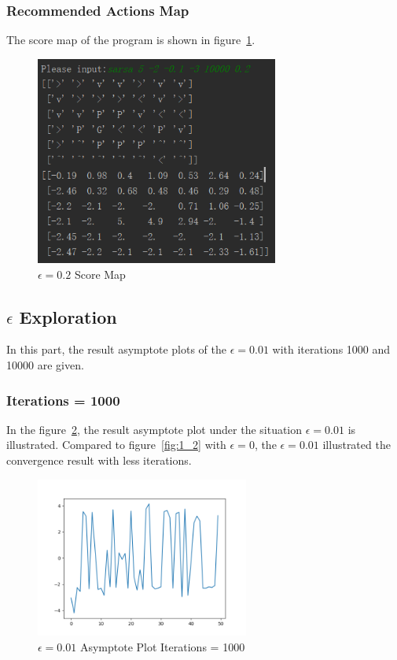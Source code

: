 \documentclass[11pt, a4paper]{article}
\begin{document}
\newpage

\subsubsection{Recommended Actions Map}

The score map of the program is shown in figure~\ref{fig:3_3}.


\begin{figure}[htbp] 
	\begin{center}
		\includegraphics[width=8cm]{3_map} 
		\caption{$\epsilon = 0.2$ Score Map} 
		\label{fig:3_3}
	\end{center}
\end{figure}


\subsection{$\epsilon$ Exploration}

In this part, the result asymptote plots of the $\epsilon = 0.01$ with iterations 1000 and 10000 are given.

\subsubsection{Iterations = 1000 }

In the figure~\ref{fig:4_1}, the result asymptote plot under the situation $\epsilon = 0.01$ is illustrated. Compared to figure~\ref{fig:1_2} with $\epsilon = 0$, the $\epsilon = 0.01$ illustrated the convergence result with less iterations. 

\begin{figure}[htbp] 
	\begin{center}
		\includegraphics[width=7cm]{4_e_1} 
		\caption{$\epsilon = 0.01$ Asymptote Plot Iterations = 1000} 
		\label{fig:4_1}
	\end{center}
\end{figure}
\end{document}
